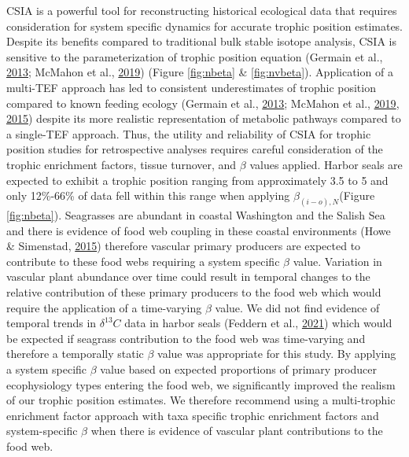 \documentclass [11pt, proquest] {uwthesis}[2015/03/03]
\begin{document}
CSIA is a powerful tool for reconstructing historical ecological data
that requires consideration for system specific dynamics for accurate
trophic position estimates. Despite its benefits compared to traditional
bulk stable isotope analysis, CSIA is sensitive to the parameterization
of trophic position equation (Germain et al.,
\protect\hyperlink{ref-Germain2013}{2013}; McMahon et al.,
\protect\hyperlink{ref-McMahon2019}{2019}) (Figure \ref{fig:nbeta} \&
\ref{fig:nvbeta}). Application of a multi-TEF approach has led to
consistent underestimates of trophic position compared to known feeding
ecology (Germain et al., \protect\hyperlink{ref-Germain2013}{2013};
McMahon et al., \protect\hyperlink{ref-McMahon2019}{2019},
\protect\hyperlink{ref-McMahon2015}{2015}) despite its more realistic
representation of metabolic pathways compared to a single-TEF approach.
Thus, the utility and reliability of CSIA for trophic position studies
for retrospective analyses requires careful consideration of the trophic
enrichment factors, tissue turnover, and \(\beta\) values applied.
Harbor seals are expected to exhibit a trophic position ranging from
approximately 3.5 to 5 and only 12\%-66\% of data fell within this range
when applying \(\beta_{(i-o),N}\)(Figure \ref{fig:nbeta}). Seagrasses
are abundant in coastal Washington and the Salish Sea and there is
evidence of food web coupling in these coastal environments (Howe \&
Simenstad, \protect\hyperlink{ref-Howe2015}{2015}) therefore vascular
primary producers are expected to contribute to these food webs
requiring a system specific \(\beta\) value. Variation in vascular plant
abundance over time could result in temporal changes to the relative
contribution of these primary producers to the food web which would
require the application of a time-varying \(\beta\) value. We did not
find evidence of temporal trends in \(\delta^{13}C\) data in harbor
seals (Feddern et al., \protect\hyperlink{ref-Feddern2021}{2021}) which
would be expected if seagrass contribution to the food web was
time-varying and therefore a temporally static \(\beta\) value was
appropriate for this study. By applying a system specific \(\beta\)
value based on expected proportions of primary producer ecophysiology
types entering the food web, we significantly improved the realism of
our trophic position estimates. We therefore recommend using a
multi-trophic enrichment factor approach with taxa specific trophic
enrichment factors and system-specific \(\beta\) when there is evidence
of vascular plant contributions to the food web.
\end{document}
